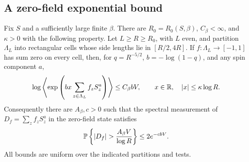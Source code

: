 \subsection{A zero-field exponential bound}

\begin{proposition}\label{prop:zero-field}
Fix $S$ and a sufficiently large finite $\beta$.  There are
$R_0=R_0(S,\beta)$, $C_\beta<\infty$, and $\kappa>0$ with the following
property.  Let $L\ge R\ge R_0$, with $L$ even, and partition $\Lambda_L$
into rectangular cells whose side lengths lie in $[R/2,4R]$.  If
$f:\Lambda_L\to[-1,1]$ has sum zero on every cell, then, for
$q=R^{-5/2}$, $b=-\log(1-q)$, and any spin component $a$,
\begin{equation}\label{eq:zero-exp}
 \log\left\langle
   \exp\left(bx\sum_{z\in\Lambda_L}f_zS_z^a\right)
 \right\rangle
 \le C_\beta bV,
 \qquad x\in\mathbb R,\quad |x|\le\kappa\log R.
\end{equation}
Consequently there are $A_\beta,c>0$ such that the spectral measurement
of $D_f=\sum_z f_zS_z^a$ in the zero-field state satisfies
\begin{equation}\label{eq:zero-tail}
 \PP\left\{|D_f|>\frac{A_\beta V}{\log R}\right\}
       \le 2e^{-cbV}.
\end{equation}
All bounds are uniform over the indicated partitions and tests.
\end{proposition}

